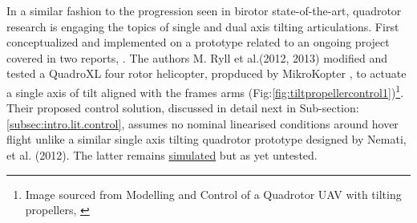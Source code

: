 \par
In a similar fashion to the progression seen in birotor state-of-the-art, quadrotor research is engaging the topics of single and dual axis tilting articulations. First conceptualized and implemented on a prototype related to an ongoing project covered in two reports, \cite{tiltpropellercontrol,tiltpropellerflight}. The authors M. Ryll et al.(2012, 2013) modified and tested a QuadroXL four rotor helicopter, propduced by MikroKopter \cite{mikrokopter}, to actuate a single axis of tilt aligned with the frames arms (Fig:\ref{fig:tiltpropellercontrol1})\footnote{Image sourced from Modelling and Control of a Quadrotor UAV with tilting propellers, \cite{tiltpropellercontrol}}. Their proposed control solution, discussed in detail next in Sub-section:\ref{subsec:intro.lit.control}, assumes no nominal linearised conditions around hover flight unlike a similar single axis tilting quadrotor prototype designed by Nemati, et al. (2012)\cite{singleaxistilting}. The latter remains  \underline{simulated} but as yet untested.

